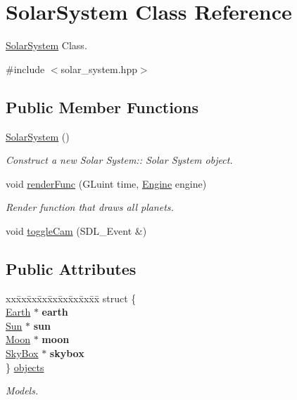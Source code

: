 \hypertarget{classSolarSystem}{}\section{Solar\+System Class Reference}
\label{classSolarSystem}


\mbox{\hyperlink{classSolarSystem}{Solar\+System}} Class.  




{\ttfamily \#include $<$solar\+\_\+system.\+hpp$>$}

\subsection*{Public Member Functions}
\begin{DoxyCompactItemize}
\item 
\mbox{\hyperlink{classSolarSystem_aba929f8f95361b60df93e505278ca725}{Solar\+System}} ()
\begin{DoxyCompactList}\small\item\em Construct a new Solar System\+:\+: Solar System object. \end{DoxyCompactList}\item 
void \mbox{\hyperlink{classSolarSystem_a91ab39c491fb5f4f8f95dcebce03a0d4}{render\+Func}} (G\+Luint time, \mbox{\hyperlink{classEngine}{Engine}} engine)
\begin{DoxyCompactList}\small\item\em Render function that draws all planets. \end{DoxyCompactList}\item 
void \mbox{\hyperlink{classSolarSystem_a8259d4214fecd930b539c0a4718dec05}{toggle\+Cam}} (S\+D\+L\+\_\+\+Event \&)
\end{DoxyCompactItemize}
\subsection*{Public Attributes}
\begin{DoxyCompactItemize}
\item 
\mbox{\label{classSolarSystem_afed699ae585924f6b1a198432a878a7f}} 
\begin{tabbing}
xx\=xx\=xx\=xx\=xx\=xx\=xx\=xx\=xx\=\kill
struct \{\\
\>\mbox{\hyperlink{classEarth}{Earth}} $\ast$ {\bfseries earth}\\
\>\mbox{\hyperlink{classSun}{Sun}} $\ast$ {\bfseries sun}\\
\>\mbox{\hyperlink{classMoon}{Moon}} $\ast$ {\bfseries moon}\\
\>\mbox{\hyperlink{classSkyBox}{SkyBox}} $\ast$ {\bfseries skybox}\\
\} \mbox{\hyperlink{classSolarSystem_afed699ae585924f6b1a198432a878a7f}{objects}}\\

\end{tabbing}\begin{DoxyCompactList}\small\item\em Models. \end{DoxyCompactList}\end{DoxyCompactItemize}



